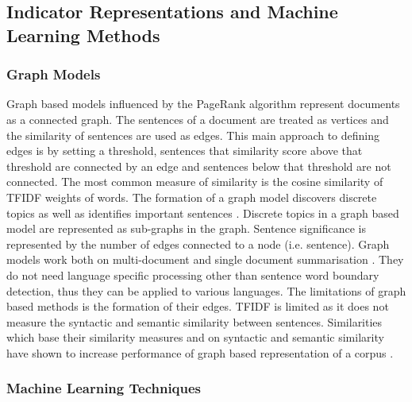 \subsection{Indicator Representations and Machine Learning Methods}
\label{subsec:2.3.2}

\subsubsection{Graph Models}
Graph based models influenced by the PageRank algorithm \citep{berkhin2005survey} represent documents as a connected graph. The sentences of a document are treated as vertices and the similarity of sentences are used as edges. This main approach to defining edges is by setting a threshold, sentences that similarity score above that threshold are connected by an edge and sentences below that threshold are not connected. The most common measure of similarity is the cosine similarity of TFIDF weights of words. The formation of a graph model discovers discrete topics as well as identifies important sentences \citep{allahyari2017text}. Discrete topics in a graph based model are represented as sub-graphs in the graph. Sentence significance is represented by the number of edges connected to a node (i.e. sentence). Graph models work both on multi-document and single document summarisation \citep{erkan2004lexrank}. They do not need language specific processing other than sentence word boundary detection, thus they can be applied to various languages. The limitations of graph based methods is the formation of their edges. TFIDF is limited as it does not measure the syntactic and semantic similarity between sentences. Similarities which base their similarity measures and on syntactic and semantic similarity have shown to increase performance of graph based representation of a corpus \citep{chali2008improving}.

\subsubsection{Machine Learning Techniques}

